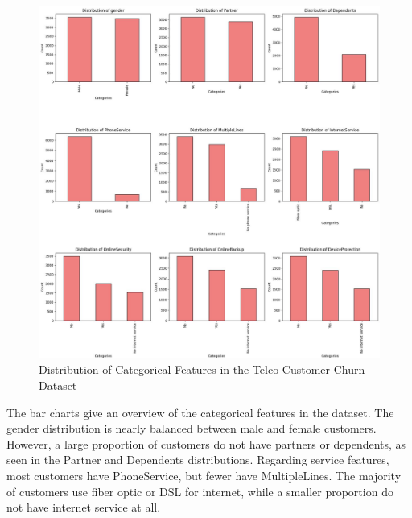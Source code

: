 \begin{figure}[hbt!]
    \centering
    \includegraphics[width=1\linewidth]{Images/2.3.b.jpg}
    \caption{Distribution of Categorical Features in the Telco Customer Churn Dataset }
    \label{fig:enter-label}
\end{figure}

The bar charts give an overview of the categorical features in the dataset. The gender distribution is nearly balanced between male and female customers. However, a large proportion of customers do not have partners or dependents, as seen in the Partner and Dependents distributions. Regarding service features, most customers have PhoneService, but fewer have MultipleLines. The majority of customers use fiber optic or DSL for internet, while a smaller proportion do not have internet service at all. \\

